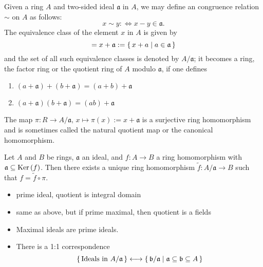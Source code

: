 \begin{defn}
    Given a ring \(A\) and two-sided ideal \(\mathfrak{a}\) in \(A\), we may define an congruence relation \(\sim\) on \(A\) as follows:
    \begin{equation}
        x \sim y :\Longleftrightarrow x - y \in \mathfrak{a} \text{.}
    \end{equation}
    The equivalence class of the element \(x\) in \(A\) is given by
    \begin{equation}
        [x] = x + \mathfrak{a} := \makeset{x + a}{a \in \mathfrak{a}}
    \end{equation}
    and the set of all such equivalence classes is denoted by \(A / \mathfrak{a}\); it becomes a ring, the factor ring or the quotient ring of \(A\) modulo \(\mathfrak{a}\), if one defines
    \begin{enumerate}
        \item \((a + \mathfrak{a}) + (b + \mathfrak{a}) = (a + b) + \mathfrak{a}\)
        \item \((a + \mathfrak{a}) (b + \mathfrak{a}) = (ab) + \mathfrak{a}\)
    \end{enumerate}
    The map \(\pi: R \longrightarrow A / \mathfrak{a}, \, x \mapsto \pi(x) := x + \mathfrak{a}\) is a surjective ring homomorphism and is sometimes called the natural quotient map or the canonical homomorphism.
\end{defn}

\begin{prps}
    Let \(A\) and \(B\) be rings, \(\mathfrak{a}\) an ideal, and \(f: A \longrightarrow B\) a ring homomorphism with \(\mathfrak{a} \subseteq \mathrm{Ker} \left( f \right)\). Then there exists a unique ring homomorphism \(\tilde{f}: A / \mathfrak{a} \longrightarrow B\) such that \(f = \tilde{f} \circ \pi\).
\end{prps}

\begin{defn}
    
\end{defn}

\begin{thm}
    \begin{itemize}
        \item prime ideal, quotient is integral domain
        \item same as above, but if prime maximal, then quotient is a fields
        \item Maximal ideals are prime ideals.
        \item There is a 1:1 correspondence
        \begin{equation}
            \left\{\, \text{Ideals in \(A / \mathfrak{a}\)} \,\right\} \longleftrightarrow \left\{\, \mathfrak{b} / \mathfrak{a} \mathrel{\mid} \mathfrak{a} \subseteq \mathfrak{b} \subseteq A \,\right\}
        \end{equation}
    \end{itemize}
\end{thm}

